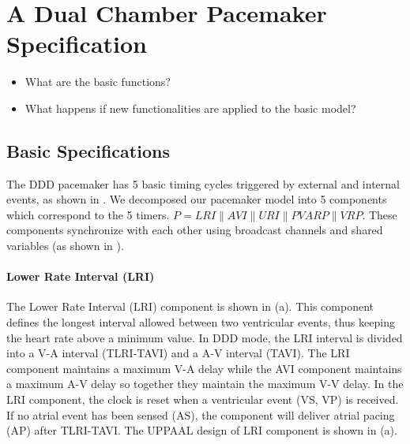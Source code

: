 \chapter{A Dual Chamber Pacemaker Specification}
\begin{itemize}
	\item What are the basic functions?
    \item What happens if new functionalities are applied to the basic model?
\end{itemize}

\section{Basic Specifications}
The DDD pacemaker has 5 basic timing cycles triggered by external and internal events, as shown in . We decomposed our pacemaker model into 5 components which correspond to the 5 timers. $P=LRI\| AVI\| URI\| PVARP\| VRP$. These components synchronize with each other using broadcast channels and shared variables (as shown in ). 

\subsubsection{Lower Rate Interval (LRI)}
\vspace{-5pt}
The Lower Rate Interval (LRI) component is shown in (a). This component defines the longest interval allowed between two ventricular events, thus keeping the heart rate above a minimum value. In DDD mode, the LRI interval is divided into a V-A interval (TLRI-TAVI) and a A-V interval (TAVI). The LRI component maintains a maximum V-A delay while the AVI component maintains a maximum A-V delay so together they maintain the maximum V-V delay. In the LRI component, the clock is reset when a ventricular event \textsf{(VS, VP)} is received. If no atrial event has been sensed \textsf{(AS)}, the component will deliver atrial pacing \textsf{(AP)} after TLRI-TAVI. The UPPAAL design of LRI component is shown in (a).

